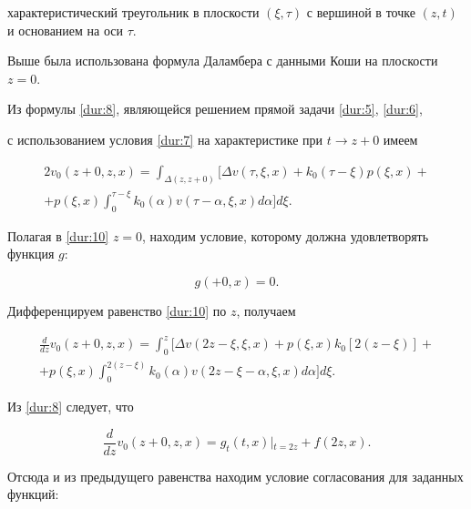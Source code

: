 характеристический треугольник в плоскости $(\xi,\tau)$ с вершиной в точке  $(z,t)$ и  основанием на оси $\tau $.

Выше  была использована формула Даламбера с данными Коши на плоскости $z = 0$.

 Из формулы \eqref{dur:8}, являющейся решением прямой задачи \eqref{dur:5}, \eqref{dur:6},  

с использованием условия \eqref{dur:7} на характеристике при $t \to z + 0$ имеем

\begin{multline}

2{v_0}(z + 0,z,x) =

\int_{\Delta (z,z + 0)} \biggl[ \Delta v(\tau ,\xi ,x) +

{k_0}(\tau  - \xi )p(\xi ,x) +

\\

+ p(\xi ,x)\int_0^{\tau  - \xi } {{k_0}(\alpha )v(\tau

 - \alpha ,\xi ,x)d\alpha }  \biggr] d\xi.

 \label{dur:10}

\end{multline}

 Полагая в \eqref{dur:10} $z = 0$,   находим условие, которому должна удовлетворять функция $g$:

\[g( + 0,x) = 0.\]

Дифференцируем равенство \eqref{dur:10} по $z$, получаем

\begin{multline}

\frac{d}{dz}v_0(z + 0,z,x) = \int_0^z [ \Delta v(2z - \xi ,\xi ,x) + p(\xi ,x)k_0[ 2(z - \xi ) ]+

\\

+ p(\xi ,x)\int_0^{2(z - \xi )} k_0(\alpha )v(2z - \xi  - \alpha ,\xi ,x)d\alpha ]d\xi.  

\label{dur:11}

\end{multline}






Из \eqref{dur:8} следует, что

\[\frac{d}{{dz}}{v_0}(z + 0,z,x) = {g_t}(t,x)\left| {_{t = 2z} + f(2z,x)}. \right.\]

 Отсюда и из предыдущего равенства находим условие согласования для заданных функций:

